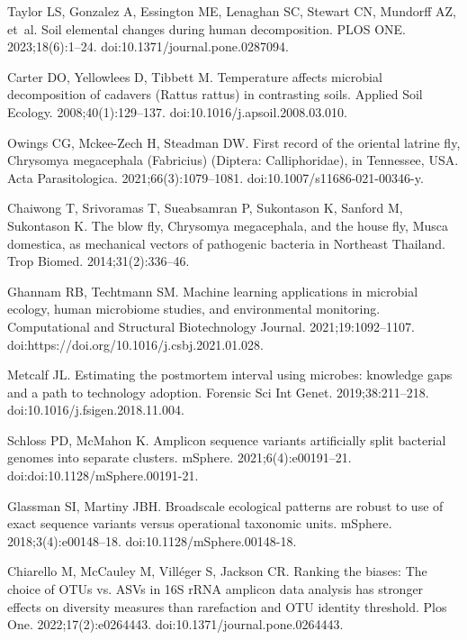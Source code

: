 \documentclass[
  10pt,
  letterpaper,
]{article}
\begin{document}
\begin{thebibliography}{10}
    Taylor LS, Gonzalez A, Essington ME, Lenaghan SC, Stewart CN, Mundorff AZ, et~al.
    \newblock Soil elemental changes during human decomposition.
    \newblock PLOS ONE. 2023;18(6):1--24.
    \newblock doi:{10.1371/journal.pone.0287094}.
    
    Carter DO, Yellowlees D, Tibbett M.
    \newblock Temperature affects microbial decomposition of cadavers ({Rattus} rattus) in contrasting soils.
    \newblock Applied Soil Ecology. 2008;40(1):129--137.
    \newblock doi:{10.1016/j.apsoil.2008.03.010}.
    
    Owings CG, Mckee-Zech H, Steadman DW.
    \newblock First record of the oriental latrine fly, {Chrysomya} megacephala ({Fabricius}) ({Diptera}: {Calliphoridae}), in {Tennessee}, {USA}.
    \newblock Acta Parasitologica. 2021;66(3):1079--1081.
    \newblock doi:{10.1007/s11686-021-00346-y}.
    
    Chaiwong T, Srivoramas T, Sueabsamran P, Sukontason K, Sanford M, Sukontason K.
    \newblock The blow fly, {Chrysomya} megacephala, and the house fly, {Musca} domestica, as mechanical vectors of pathogenic bacteria in {Northeast} {Thailand}.
    \newblock Trop Biomed. 2014;31(2):336--46.
    
    Ghannam RB, Techtmann SM.
    \newblock Machine learning applications in microbial ecology, human microbiome studies, and environmental monitoring.
    \newblock Computational and Structural Biotechnology Journal. 2021;19:1092--1107.
    \newblock doi:{https://doi.org/10.1016/j.csbj.2021.01.028}.
    
    Metcalf JL.
    \newblock Estimating the postmortem interval using microbes: knowledge gaps and a path to technology adoption.
    \newblock Forensic Sci Int Genet. 2019;38:211--218.
    \newblock doi:{10.1016/j.fsigen.2018.11.004}.
    
    Schloss PD, McMahon K.
    \newblock Amplicon sequence variants artificially split bacterial genomes into separate clusters.
    \newblock mSphere. 2021;6(4):e00191--21.
    \newblock doi:{doi:10.1128/mSphere.00191-21}.
    
    Glassman SI, Martiny JBH.
    \newblock Broadscale ecological patterns are robust to use of exact sequence variants versus operational taxonomic units.
    \newblock mSphere. 2018;3(4):e00148--18.
    \newblock doi:{10.1128/mSphere.00148-18}.
    
    Chiarello M, McCauley M, Villéger S, Jackson CR.
    \newblock Ranking the biases: {The} choice of {OTUs} vs. {ASVs} in {16S} {rRNA} amplicon data analysis has stronger effects on diversity measures than rarefaction and {OTU} identity threshold.
    \newblock Plos One. 2022;17(2):e0264443.
    \newblock doi:{10.1371/journal.pone.0264443}.
    
  \end{thebibliography}
\end{document}

